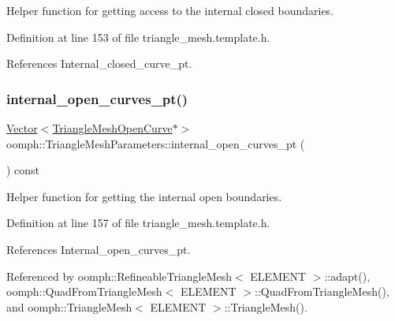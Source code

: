 Helper function for getting access to the internal closed boundaries. 



Definition at line 153 of file triangle\+\_\+mesh.\+template.\+h.



References Internal\+\_\+closed\+\_\+curve\+\_\+pt.

\mbox{\label{classoomph_1_1TriangleMeshParameters_ac2afa4153679c9319b3175e61973f938}} 
\subsubsection{\texorpdfstring{internal\+\_\+open\+\_\+curves\+\_\+pt()}{internal\_open\_curves\_pt()}\hspace{0.1cm}{\footnotesize\ttfamily [1/2]}}
{\footnotesize\ttfamily \hyperlink{classoomph_1_1Vector}{Vector}$<$\hyperlink{classoomph_1_1TriangleMeshOpenCurve}{Triangle\+Mesh\+Open\+Curve}$\ast$$>$ oomph\+::\+Triangle\+Mesh\+Parameters\+::internal\+\_\+open\+\_\+curves\+\_\+pt (\begin{DoxyParamCaption}{ }\end{DoxyParamCaption}) const\hspace{0.3cm}{\ttfamily [inline]}}



Helper function for getting the internal open boundaries. 



Definition at line 157 of file triangle\+\_\+mesh.\+template.\+h.



References Internal\+\_\+open\+\_\+curves\+\_\+pt.



Referenced by oomph\+::\+Refineable\+Triangle\+Mesh$<$ E\+L\+E\+M\+E\+N\+T $>$\+::adapt(), oomph\+::\+Quad\+From\+Triangle\+Mesh$<$ E\+L\+E\+M\+E\+N\+T $>$\+::\+Quad\+From\+Triangle\+Mesh(), and oomph\+::\+Triangle\+Mesh$<$ E\+L\+E\+M\+E\+N\+T $>$\+::\+Triangle\+Mesh().

\mbox{\label{classoomph_1_1TriangleMeshParameters_aa25edb5250e94e966622ae4c460f996b}} 
